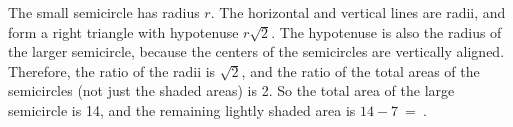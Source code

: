 \documentclass{article}
\begin{document}
The small semicircle has radius $r$.
The horizontal and vertical lines are radii, and form a right triangle with hypotenuse $r\sqrt{2}$.
The hypotenuse is also the radius of the larger semicircle, because the centers of the semicircles are vertically aligned.
Therefore, the ratio of the radii is $\sqrt{2}$, and the ratio of the total areas of the semicircles (not just the shaded areas) is 2.
So the total area of the large semicircle is 14, and the remaining lightly shaded area is $14-7$~=
\,.
\end{document}
